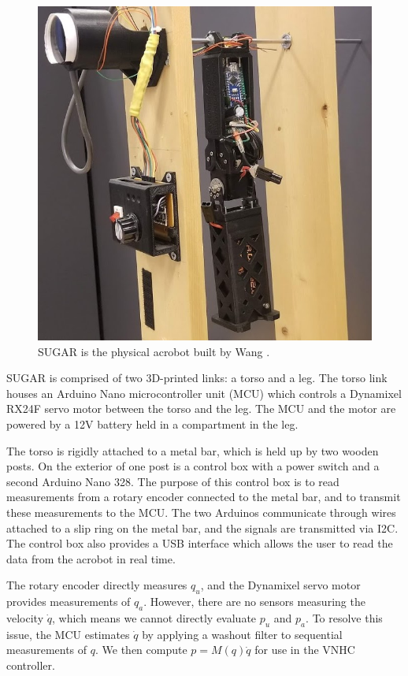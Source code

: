 \documentclass[journal,twoside,onecolumn,draftclsnofoot,web]{ieeecolor}
\begin{document}
{\begin{figure}
    \centering
    \includegraphics[width=0.9\linewidth]{xingbo_acrobot.jpg}
    \caption{SUGAR is the physical acrobot built by Wang \cite{xingbo_thesis}.}
    \label{fig:xingbo-acrobot}
\end{figure}

SUGAR is comprised of two 3D-printed links: a torso and a leg.
The torso link houses an Arduino Nano microcontroller unit (MCU) which controls
a Dynamixel RX24F servo motor between the torso and the leg.
The MCU and the motor are powered by a 12V battery held in a compartment
in the leg.

The torso is rigidly attached to a metal bar, which is held up by two wooden
posts.
On the exterior of one post is a control box with a power switch and a second
Arduino Nano 328.
The purpose of this control box is to read measurements from a rotary
encoder connected to the metal bar, and to transmit these measurements to the
MCU.
The two Arduinos communicate through wires attached to a slip ring on the metal
bar, and the signals are transmitted via I2C.
The control box also provides a USB interface which allows the user to read the
data from the acrobot in real time.

The rotary encoder directly measures \(q_u\), and the Dynamixel servo
motor provides measurements of \(q_a\).
However, there are no sensors measuring the velocity \(\dot{q}\), which means we cannot
directly evaluate \(p_u\) and \(p_a\).
To resolve this issue, the MCU estimates \(\dot{q}\) by applying a washout
filter to sequential measurements of \(q\).
We then compute \(p = M(q)\dot{q}\) for use in the VNHC controller.

}
\end{document}
